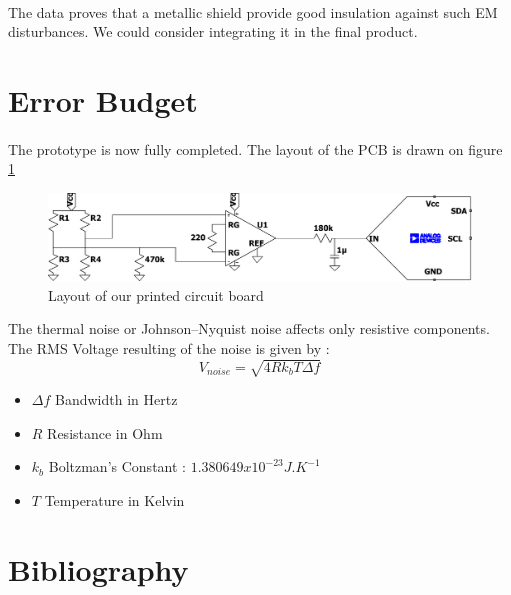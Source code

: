 \documentclass{article}[12pt]
\begin{document}
\paragraph{}
The data proves that a metallic shield provide good insulation against such EM disturbances. We could consider integrating it in the final product.
\section{Error Budget}
\paragraph{}
The prototype is now fully completed. The layout of the PCB is drawn on figure \ref{fig:layout}
\begin{figure}[H]
    \centering
    \includegraphics[width=\textwidth]{figures/layout.pdf}
    \caption{Layout of our printed circuit board}
    \label{fig:layout}
\end{figure}
The thermal noise or Johnson–Nyquist noise affects only resistive components. The RMS Voltage resulting of the noise is given by :
\begin{equation}
    V_{noise}=\sqrt{4Rk_bT\Delta f}
\end{equation}
\begin{itemize}
    \item $\Delta f$ Bandwidth in Hertz
    \item $R$ Resistance in Ohm
    \item $k_b$ Boltzman's Constant : $1.380649x10^{-23} J.K^{-1}$ 
    \item $T$ Temperature in Kelvin
\end{itemize}
\newpage
\section{Bibliography}


\end{document}
